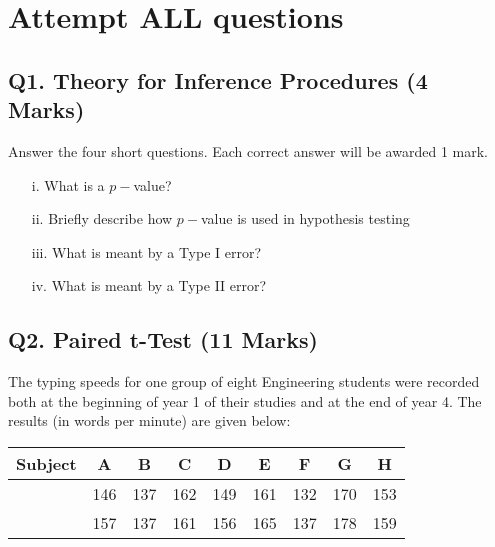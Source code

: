 \documentclass[a4paper,12pt]{article}
\begin{document}
\section*{Attempt ALL questions}

\bigskip
\subsection*{Q1. Theory for Inference Procedures (4 Marks)}
Answer the four short questions. Each correct answer will be awarded 1 mark.
\begin{itemize}
\item[i.] What is a $p-$value?
\item[ii.] Briefly describe how $p-$value is used in hypothesis testing
\item[iii.] What is meant by a Type I error?
\item[iv.] What is meant by a Type II error?
\end{itemize}
%

\subsection*{Q2. Paired t-Test (11 Marks)}

The typing speeds for one group of eight Engineering students were recorded both at the beginning of year 1 of their studies and at the end of year 4. The results (in words per minute) are given below:

\begin{center}
\begin{tabular}{|c|c|c|c|c|c|c|c|c|}
\hline
Subject& A& B& C& D& E &F &G &H \\ \hline
&146 &137 &162 &149 &161 &132 &170& 153\\ \hline
 &157 & 137 & 161 & 156& 165& 137& 178& 159
\\ \hline
\end{tabular}
\end{center}

\end{document}
